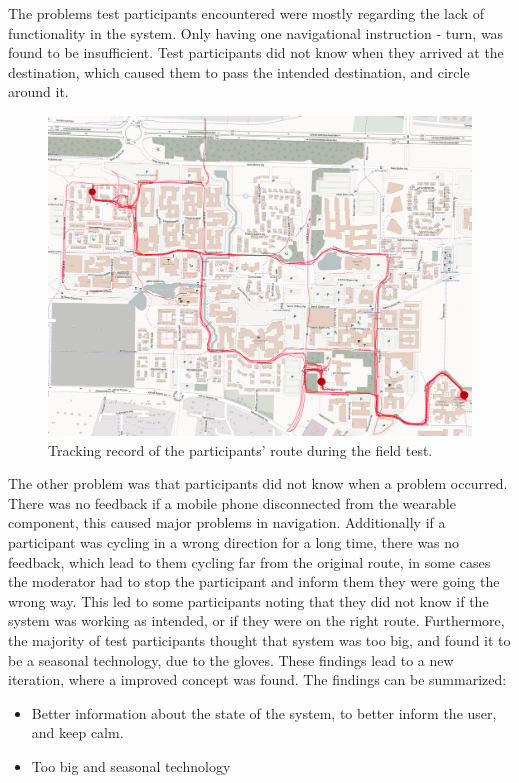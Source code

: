 \documentclass{sigchi}
\begin{document}
The problems test participants encountered were mostly regarding the lack of functionality in the system. Only having one navigational instruction - turn, was found to be insufficient. Test participants did not know when they arrived at the destination, which caused them to pass the intended destination, and circle around it.
\begin{figure}[!b]
  \centering
  \includegraphics[width=1.02\columnwidth]{figures/heatmap.jpg}
  \caption{Tracking record of the participants' route during the field test.}
    \label{fig:heatmap}
\end{figure} 
The other problem was that participants did not know when a problem occurred. There was no feedback if a mobile phone disconnected from the wearable component, this caused major problems in navigation. Additionally if a participant was cycling in a wrong direction for a long time, there was no feedback, which lead to them cycling far from the original route, in some cases the moderator had to stop the participant and inform them they were going the wrong way. This led to some participants noting that they did not know if the system was working as intended, or if they were on the right route.
\newline
\newline
Furthermore, the majority of test participants thought that system was too big, and found it to be a seasonal technology, due to the gloves.
These findings lead to a new iteration, where a improved concept was found. The findings can be summarized:
\begin{itemize}
\item Better information about the state of the system, to better inform the user, and keep calm.
\item Too big and seasonal technology 
\end{itemize}  
\end{document}
